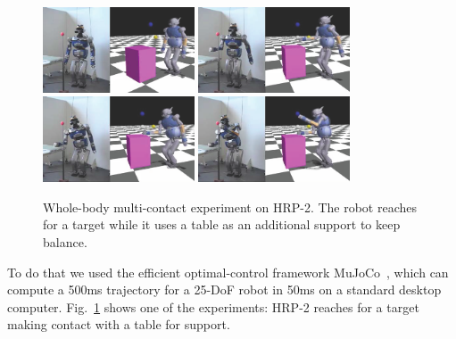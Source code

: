 \begin{figure}[!tbp]
\begin{center}
	\includegraphics[width=0.4\textwidth]{figures/mujoco/ss0.png} \quad
	\includegraphics[width=0.4\textwidth]{figures/mujoco/ss1.png} \\
	\includegraphics[width=0.4\textwidth]{figures/mujoco/ss2.png} \quad
	\includegraphics[width=0.4\textwidth]{figures/mujoco/ss3.png}
	\caption{Whole-body multi-contact experiment on HRP-2. The robot reaches for a target while it uses a table as an additional support to keep balance.}
	\label{fig:mujoco}
\end{center}
\end{figure}
To do that we used the efficient optimal-control framework MuJoCo~\cite{Todorov}, which can compute a 500ms trajectory for a 25-DoF robot in 50ms on a standard desktop computer.
Fig.~\ref{fig:mujoco} shows one of the experiments: HRP-2 reaches for a target making contact with a table for support.


